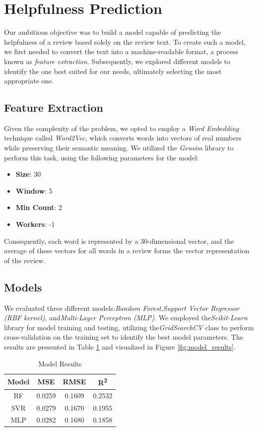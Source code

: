 \section{Helpfulness Prediction}
Our ambitious objective was to build a model capable of predicting the helpfulness of a review based solely on the review text.
To create such a model, we first needed to convert the text into a machine-readable format, a process known as \textit{feature extraction}.
Subsequently, we explored different models to identify the one best suited for our needs, ultimately selecting the most appropriate one.

\subsection*{Feature Extraction}
Given the complexity of the problem, we opted to employ a \textit{Word Embedding} technique called \textit{Word2Vec}, which converts words into
vectors of real numbers while preserving their semantic meaning. We utilized the \textit{Gensim} library to perform this task, using the
following parameters for the model:
\begin{itemize}[noitemsep, leftmargin=*]
    \item \textbf{Size}: 30
    \item \textbf{Window}: 5
    \item \textbf{Min Count}: 2
    \item \textbf{Workers}: -1
\end{itemize}
Consequently, each word is represented by a 30-dimensional vector, and the average of these vectors for all words in a review forms the vector
representation of the review.

\subsection*{Models}
We evaluated three different models:\textit{Random Forest},\textit{Support Vector Regressor (RBF kernel)}, and\textit{Multi-Layer Perceptron (MLP)}.
We employed the\textit{Scikit-Learn} library for model training and testing, utilizing the\textit{GridSearchCV} class to perform cross-validation on
the training set to identify the best model parameters. The results are presented in Table \ref{tab:model_results} and visualized in Figure
\ref{fig:model_results}.

\begin{table}[H]
    \footnotesize
    \centering
    \caption{Model Results}
    \label{tab:model_results}
    \begin{tabular}{|c|c|c|c|}
        \hline
        Model & MSE    & RMSE   & R\textsuperscript{2} \\
        \hline
        RF    & 0.0259 & 0.1609 & 0.2532               \\
        SVR   & 0.0279 & 0.1670 & 0.1955               \\
        MLP   & 0.0282 & 0.1680 & 0.1858               \\
        \hline
    \end{tabular}
\end{table}

